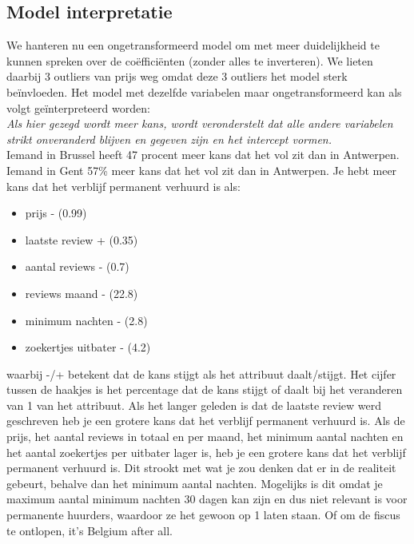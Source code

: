 \documentclass[a4paper,kulak]{kulakarticle} %
\begin{document}
\subsection{Model interpretatie}
We hanteren nu een ongetransformeerd model om met meer duidelijkheid te kunnen spreken over de coëfficiënten (zonder alles te inverteren).
We lieten daarbij 3 outliers van prijs weg omdat deze 3 outliers het model sterk beïnvloeden.
Het model met dezelfde variabelen maar ongetransformeerd kan als volgt geïnterpreteerd worden:\\
\textit{Als hier gezegd wordt meer kans, wordt veronderstelt dat alle andere variabelen strikt onveranderd blijven en gegeven zijn en het intercept vormen.}\\
Iemand in Brussel heeft 47 procent meer kans dat het vol zit dan in Antwerpen. Iemand in Gent   57\% meer kans dat het vol zit dan in Antwerpen.
Je hebt meer kans dat het verblijf permanent verhuurd is als:
\begin{itemize}
	\item prijs -     (0.99)
	\item laatste review  + (0.35)
	\item aantal reviews - (0.7)
	\item reviews maand - (22.8)
	\item minimum nachten - (2.8)
	\item zoekertjes uitbater - (4.2)
\end{itemize}
waarbij -/+ betekent dat de kans stijgt als het attribuut daalt/stijgt.
Het cijfer tussen de haakjes is het percentage dat de kans stijgt of daalt bij het veranderen van 1 van het attribuut.
Als het langer geleden is dat de laatste review werd geschreven heb je een grotere kans dat het verblijf permanent verhuurd is.
Als de prijs, het aantal reviews in totaal en per maand, het minimum aantal nachten en het aantal zoekertjes per uitbater lager is, heb je een grotere kans dat het verblijf permanent verhuurd is.
Dit strookt met wat je zou denken dat er in de realiteit gebeurt, behalve dan het minimum aantal nachten.
Mogelijks is dit omdat je maximum aantal minimum nachten 30 dagen kan zijn en dus niet relevant is voor permanente huurders, waardoor ze het gewoon op 1 laten staan. Of om de fiscus te ontlopen, it's Belgium after all.
\end{document}
